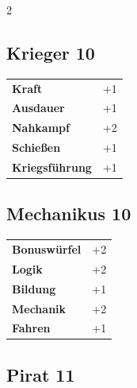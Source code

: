 \begin{multicols}{2}
\begin{tcolorbox}
\end{tcolorbox}

\begin{tcolorbox}
    \subsection*{Krieger \hfill \small{10 }}
    \tcblower




\begin{tabular}{@{}ll@{}}
    \textbf{Kraft} & +1\\
    \textbf{Ausdauer} & +1\\
    \textbf{Nahkampf} & +2\\
    \textbf{Schießen} & +1\\
    \textbf{Kriegsführung} & +1\\
\end{tabular}


\end{tcolorbox}

\begin{tcolorbox}
    \subsection*{Mechanikus \hfill \small{10 }}
    \tcblower




\begin{tabular}{@{}ll@{}}
    \textbf{Bonuswürfel} & +2\\
    \textbf{Logik} & +2\\
    \textbf{Bildung} & +1\\
    \textbf{Mechanik} & +2\\
    \textbf{Fahren} & +1\\
\end{tabular}


\end{tcolorbox}

\begin{tcolorbox}
    \subsection*{Pirat \hfill \small{11 }}
    \tcblower





\end{tcolorbox}
\end{multicols}
